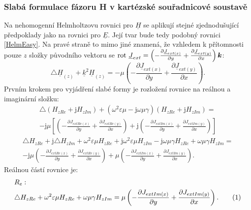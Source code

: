 \documentclass[12pt,a4paper,oneside]{article}
\numberwithin{equation}{section} %
\numberwithin{figure}{section} %
\numberwithin{table}{section} %
\newcommand{\mj}{\mathrm{j}} %
\renewcommand{\vec}[1]{\mbox{\boldmath$#1$}} %
\newcommand{\faz}[1]{{\underline{#1}}} %
\newcommand{\rot}{\mathrm{rot}\ }
\newcommand\numberthis{\addtocounter{equation}{1}\tag{\theequation}}
\begin{document}
\subsubsection{Slabá formulace fázoru H v kartézské souřadnicové soustavě}
Na nehomogenní Helmholtzovu rovnici pro $\faz{H}$ se aplikují stejné zjednodušující předpoklady jako na rovnici pro $\faz{E}$. Její tvar bude tedy podobný rovnici \ref{HelmEasy}. Na pravé straně to mimo jiné znamená, že vzhledem k přítomnosti pouze $z$ složky původního vektoru se $\rot \faz{J} _{ext} = \left( - \frac{\partial \faz{J} _{ext(x)}}{\partial y} + \frac{\partial \faz{J} _{ext(y)}}{\partial x} \right) \vec{k}$:
\begin{equation}
\label{HelmEasyH}
\triangle \faz{H} _{(z)} + \faz{k} ^2 \faz{H} _{(z)} = - \mu \left( - \frac{\partial \faz{J} _{ext(x)}}{\partial y} + \frac{\partial \faz{J} _{ext(y)}}{\partial x} \right) .
\end{equation}
Prvním krokem pro vyjádření slabé formy je rozložení rovnice na reálnou a imaginární složku:
\begin{equation}
\begin{split}
\triangle (H _{zRe} + \mj H _{zIm}) + (\omega ^2 \varepsilon \mu - \mj \omega \mu \gamma) (H _{zRe} + \mj H _{zIm}) =\\ 
- \mj \mu \left[ \left( - \frac{\partial J _{extRe(x)}}{\partial y} + \frac{\partial J _{extRe(y)}}{\partial x} \right) + \mj \left( - \frac{\partial J _{extIm(x)}}{\partial y} + \frac{\partial J _{extIm(y)}}{\partial x} \right) \right]
\end{split}
\end{equation}
\begin{equation}
\begin{split}
\triangle H _{zRe} + \mj \triangle H _{zIm} + \omega ^2 \varepsilon \mu H_ {zRe} + \mj \omega ^2 \varepsilon \mu H _{zIm} - \mj \omega \mu \gamma H _{zRe} + \omega \mu \gamma H _{zIm} =\\
- \mj \mu \left( - \frac{\partial J _{extRe(x)}}{\partial y} + \frac{\partial J _{extRe(y)}}{\partial x} \right) + \mu \left( - \frac{\partial J _{extIm(x)}}{\partial y} + \frac{\partial J _{extIm(y)}}{\partial x} \right) .
\end{split}
\end{equation}
Reálnou částí rovnice je:
\begin{align*}
&R_{e}:
\\
&\triangle H_ {zRe} + \omega ^2 \varepsilon \mu H_ {zRe} + \omega \mu \gamma H _{zIm} = \mu \left( - \frac{\partial J _{extIm(x)}}{\partial y} + \frac{\partial J _{extIm(y)}}{\partial x} \right) .
\numberthis
\end{align*}
\end{document}
